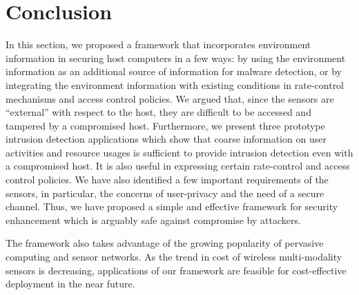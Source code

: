 \section{Conclusion}
\label{sec:conclusion}

In this section, we proposed a framework that incorporates environment
information in securing host computers in a few ways: by using the
environment information as an additional source of information for
malware detection, or by integrating the environment information
with existing conditions in rate-control mechanisms and access
control policies.   We argued that, since the sensors are
``external'' with respect to the host, they are difficult to be
accessed and tampered by a compromised host. Furthermore, 
we present three prototype intrusion detection applications which show that
coarse information on user activities and resource usages is
sufficient to provide intrusion detection even with a compromised host.
It is also useful in expressing certain rate-control and access control
policies. We have also identified a few important requirements of
the sensors, in particular, the concerns of user-privacy and the
need of a secure channel. Thus, we have proposed a simple and
effective framework for security enhancement which is arguably safe
against compromise by attackers.

The framework also takes advantage of the growing popularity of
pervasive computing and sensor networks.  As the trend in cost of wireless
multi-modality sensors is decreasing, applications of our framework are
feasible for cost-effective deployment in the near future.
